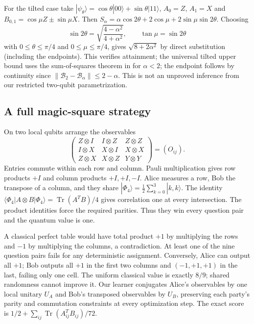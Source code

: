 \documentclass[11pt,oneside,openany]{book}
\theoremstyle{definition}\newtheorem{definition}[theorem]{Definition}
\theoremstyle{remark}\newtheorem{remark}[theorem]{Remark}
\begin{document}
For the tilted case take
$|\psi_\theta\rangle=\cos\theta|00\rangle+\sin\theta|11\rangle$,
$A_0=Z$, $A_1=X$ and $B_{0,1}=\cos\mu Z\mathbin{\pm}\sin\mu X$.
Then $S_\alpha=\alpha\cos2\theta+2\cos\mu+
2\sin\mu\sin2\theta$. Choosing
\[
 \sin2\theta=\sqrt{\frac{4-\alpha^2}{4+\alpha^2}},\qquad
 \tan\mu=\sin2\theta
\]
with $0\le\theta\le\pi/4$ and $0\le\mu\le\pi/4$,
gives $\sqrt{8+2\alpha^2}$ by direct substitution (including the endpoints).
This verifies attainment; the universal tilted upper bound uses the
sum-of-squares theorem in \cite{GameTilted} for $\alpha<2$; the endpoint
follows by continuity since $\|\mathcal B_2-\mathcal B_\alpha\|\le2-\alpha$.
This is not an unproved inference from
our restricted two-qubit parametrization.

\subsection{A full magic-square strategy}
On two local qubits arrange the observables
\[
 \begin{pmatrix}
 Z\otimes I&I\otimes Z&Z\otimes Z\\
 I\otimes X&X\otimes I&X\otimes X\\
 Z\otimes X&X\otimes Z&Y\otimes Y
 \end{pmatrix}=(O_{ij}).
\]
Entries commute within each row and column. Pauli multiplication gives row
products $+I$ and column products $+I,+I,-I$. Alice measures a row, Bob the
transpose of a column, and they share
$|\Phi_4\rangle=\frac12\sum_{k=0}^3|k,k\rangle$.
The identity $\langle\Phi_4|A\otimes B|\Phi_4\rangle=
\operatorname{Tr}(A^TB)/4$ gives correlation one at every intersection.
The product identities force the required parities. Thus they win every
question pair and the quantum value is one.

A classical perfect table would have total product $+1$ by multiplying the
rows and $-1$ by multiplying the columns, a contradiction. At least one of
the nine question pairs fails for any deterministic assignment. Conversely,
Alice can output all $+1$; Bob outputs all $+1$ in the first two columns and
$(-1,+1,+1)$ in the last, failing only one cell. The uniform classical value
is exactly $8/9$; shared randomness cannot improve it.
Our learner conjugates Alice's observables by one local unitary $U_A$ and
Bob's transposed observables by $U_B$, preserving each party's parity and
commutation constraints at every optimization step. The exact score is
$1/2+\sum_{ij}\operatorname{Tr}(A_{ij}^TB_{ij})/72$.
\end{document}
